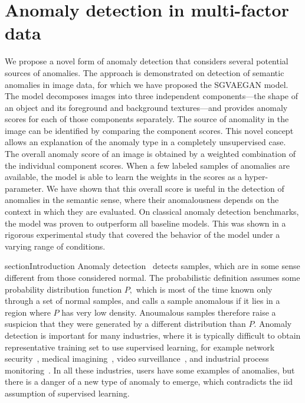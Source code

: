 \chapter{Anomaly detection in multi-factor data}

We propose a novel form of anomaly detection that considers several potential sources of anomalies. The approach is demonstrated on detection of semantic anomalies in image data, for which we have proposed the SGVAEGAN model. The model decomposes images into three independent components---the shape of an object and its foreground and background textures---and provides anomaly scores for each of those components separately. The source of anomality in the image can be identified by comparing the component scores. This novel concept  allows an explanation of the anomaly type in a completely unsupervised case. 
The overall anomaly score of an image is obtained by a weighted combination of the individual component scores. When a few labeled samples of anomalies are available, the model is able to learn the weights in the scores as a hyper-parameter. We have shown that this overall score is useful in the detection of anomalies in the semantic sense, where their anomalousness depends on the context in which they are evaluated. On classical anomaly detection benchmarks, the model was proven to outperform all baseline models. This was shown in a rigorous experimental study that covered the behavior of the model under a varying range of conditions.

section{Introduction}
Anomaly detection~\cite{chandola2009anomaly, patcha2007overview} detects samples, which are in some sense different from those considered normal. The probabilistic definition assumes some probability distribution function $P,$ which is most of the time known only through a set of normal samples, and calls a sample anomalous if it lies in a region where $P$ has very low density. Anoumalous samples therefore raise a suspicion that they were generated by a different distribution than $P.$ Anomaly detection is important for many industries, where it is typically difficult to obtain representative training set to use supervised learning, for example network security~\cite{vanerio2017ensemble}, medical imagining~\cite{schleglFAnoGANFastUnsupervised2019}, video surveillance~\cite{zhou2019anomalynet}, and industrial process monitoring~\cite{mahmoudi2019layerwise, bai2020anomaly, choi2020gan}. In all these industries, users have some examples of anomalies, but there is a danger of a new type of anomaly to emerge, which contradicts the iid assumption of supervised learning.
 
